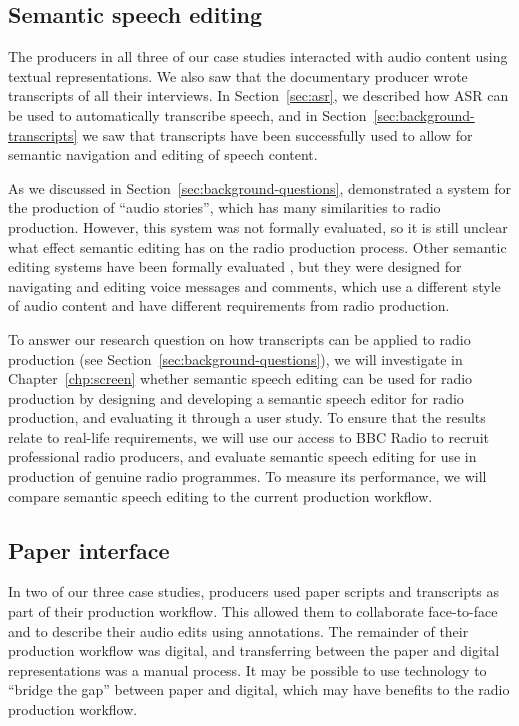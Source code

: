 \subsection{Semantic speech editing}

The producers in all three of our case studies interacted with audio content using textual representations. We also saw
that the documentary producer wrote transcripts of all their interviews.  In Section~\ref{sec:asr}, we described how
ASR can be used to automatically transcribe speech, and in Section~\ref{sec:background-transcripts} we saw that
transcripts have been successfully used to allow for semantic navigation and editing of speech content.

As we discussed in Section~\ref{sec:background-questions}, \citet{Rubin2013} demonstrated a system for the production
of ``audio stories'', which has many similarities to radio production.  However, this system was not formally
evaluated, so it is still unclear what effect semantic editing has on the radio production process. Other semantic
editing systems have been formally evaluated \citep{Whittaker2004,Yoon2014,Sivaraman2016}, but they were designed for
navigating and editing voice messages and comments, which use a different style of audio content and have different
requirements from radio production.

To answer our research question on how transcripts can be applied to radio production (see
Section~\ref{sec:background-questions}), we will investigate in Chapter~\ref{chp:screen} whether semantic speech
editing can be used for radio production by designing and developing a semantic speech editor for radio production, and
evaluating it through a user study.  To ensure that the results relate to real-life requirements, we will use our
access to BBC Radio to recruit professional radio producers, and evaluate semantic speech editing for use in production
of genuine radio programmes.  To measure its performance, we will compare semantic speech editing to the current
production workflow.

\subsection{Paper interface}

In two of our three case studies, producers used paper scripts and transcripts as part of their production workflow.
This allowed them to collaborate face-to-face and to describe their audio edits using annotations. The remainder of
their production workflow was digital, and transferring between the paper and digital representations was a manual
process.  It may be possible to use technology to ``bridge the gap'' between paper and digital, which may have benefits
to the radio production workflow.

